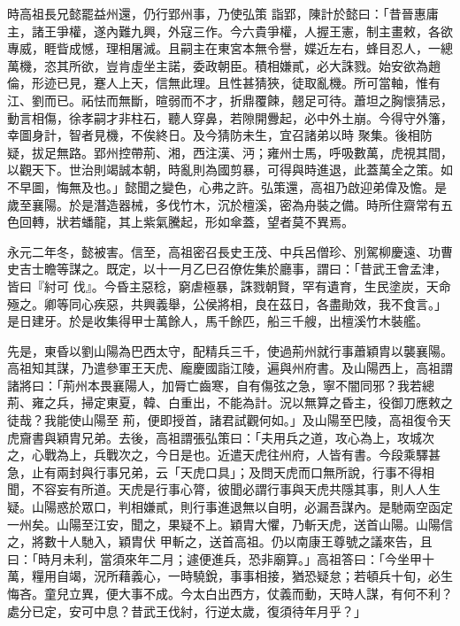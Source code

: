 \begin{pinyinscope}
 時高祖長兄懿罷益州還，仍行郢州事，乃使弘策
 詣郢，陳計於懿曰：「昔晉惠庸主，諸王爭權，遂內難九興，外寇三作。今六貴爭權，人握王憲，制主畫敕，各欲專威，睚眥成憾，理相屠滅。且嗣主在東宮本無令譽，媟近左右，蜂目忍人，一總萬機，恣其所欲，豈肯虛坐主諾，委政朝臣。積相嫌貳，必大誅戮。始安欲為趙倫，形迹已見，蹇人上天，信無此理。且性甚猜狹，徒取亂機。所可當軸，惟有江、劉而已。祏怯而無斷，暄弱而不才，折鼎覆餗，翹足可待。蕭坦之胸懷猜忌，動言相傷，徐孝嗣才非柱石，聽人穿鼻，若隙開釁起，必中外土崩。今得守外籓，幸圖身計，智者見機，不俟終日。及今猜防未生，宜召諸弟以時
 聚集。後相防疑，拔足無路。郢州控帶荊、湘，西注漢、沔；雍州士馬，呼吸數萬，虎視其間，以觀天下。世治則竭誠本朝，時亂則為國剪暴，可得與時進退，此蓋萬全之策。如不早圖，悔無及也。」懿聞之變色，心弗之許。弘策還，高祖乃啟迎弟偉及憺。是歲至襄陽。於是潛造器械，多伐竹木，沉於檀溪，密為舟裝之備。時所住齋常有五色回轉，狀若蟠龍，其上紫氣騰起，形如傘蓋，望者莫不異焉。



 永元二年冬，懿被害。信至，高祖密召長史王茂、中兵呂僧珍、別駕柳慶遠、功曹史吉士瞻等謀之。既定，以十一月乙巳召僚佐集於廳事，謂曰：「昔武王會孟津，皆曰『紂可
 伐』。今昏主惡稔，窮虐極暴，誅戮朝賢，罕有遺育，生民塗炭，天命殛之。卿等同心疾惡，共興義舉，公侯將相，良在茲日，各盡勛效，我不食言。」是日建牙。於是收集得甲士萬餘人，馬千餘匹，船三千艘，出檀溪竹木裝艦。



 先是，東昏以劉山陽為巴西太守，配精兵三千，使過荊州就行事蕭穎胄以襲襄陽。高祖知其謀，乃遣參軍王天虎、龐慶國詣江陵，遍與州府書。及山陽西上，高祖謂諸將曰：「荊州本畏襄陽人，加脣亡齒寒，自有傷弦之急，寧不闇同邪？我若總荊、雍之兵，掃定東夏，韓、白重出，不能為計。況以無算之昏主，役御刀應敕之徒哉？我能使山陽至
 荊，便即授首，諸君試觀何如。」及山陽至巴陵，高祖復令天虎齎書與穎胄兄弟。去後，高祖謂張弘策曰：「夫用兵之道，攻心為上，攻城次之，心戰為上，兵戰次之，今日是也。近遣天虎往州府，人皆有書。今段乘驛甚急，止有兩封與行事兄弟，云「天虎口具」；及問天虎而口無所說，行事不得相聞，不容妄有所道。天虎是行事心膂，彼聞必謂行事與天虎共隱其事，則人人生疑。山陽惑於眾口，判相嫌貳，則行事進退無以自明，必漏吾謀內。是馳兩空函定一州矣。山陽至江安，聞之，果疑不上。穎胄大懼，乃斬天虎，送首山陽。山陽信之，將數十人馳入，穎胄伏
 甲斬之，送首高祖。仍以南康王尊號之議來告，且曰：「時月未利，當須來年二月；遽便進兵，恐非廟算。」高祖答曰：「今坐甲十萬，糧用自竭，況所藉義心，一時驍銳，事事相接，猶恐疑怠；若頓兵十旬，必生悔吝。童兒立異，便大事不成。今太白出西方，仗義而動，天時人謀，有何不利？處分已定，安可中息？昔武王伐紂，行逆太歲，復須待年月乎？」




\end{pinyinscope}
